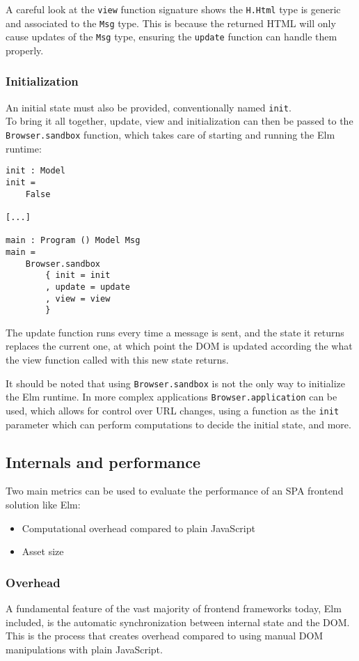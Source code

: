 A careful look at the \texttt{view} function signature shows the \texttt{H.Html} type is generic and associated to the \texttt{Msg} type. This is because the returned HTML will only cause updates of the \texttt{Msg} type, ensuring the \texttt{update} function can handle them properly.

\subsubsection{Initialization}
An initial state must also be provided, conventionally named \texttt{init}.\\
To bring it all together, update, view and initialization can then be passed to the \texttt{Browser.sandbox} function, which takes care of starting and running the Elm runtime:
\begin{verbatim}
init : Model
init =
    False

[...]

main : Program () Model Msg
main =
    Browser.sandbox
        { init = init
        , update = update
        , view = view
        }
\end{verbatim}

The update function runs every time a message is sent, and the state it returns replaces the current one, at which point the DOM is updated according the what the view function called with this new state returns.

It should be noted that using \texttt{Browser.sandbox} is not the only way to initialize the Elm runtime. In more complex applications \texttt{Browser.application} can be used, which allows for control over URL changes, using a function as the \texttt{init} parameter which can perform computations to decide the initial state, and more.

\subsection{Internals and performance}
Two main metrics can be used to evaluate the performance of an SPA frontend solution like Elm:
\begin{itemize}
    \item Computational overhead compared to plain JavaScript
    \item Asset size
\end{itemize}

\subsubsection{Overhead}
A fundamental feature of the vast majority of frontend frameworks today, Elm included, is the automatic synchronization between internal state and the DOM. This is the process that creates overhead compared to using manual DOM manipulations with plain JavaScript.\\

